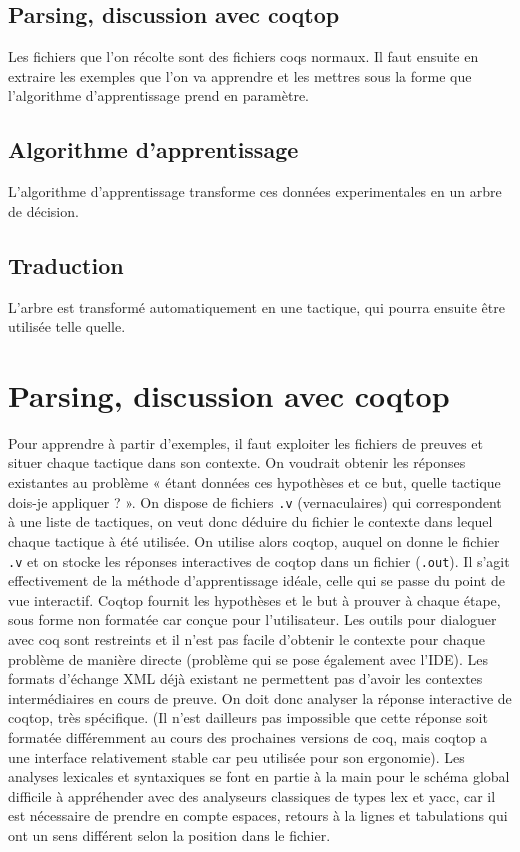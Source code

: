   \subsection{Parsing, discussion avec coqtop}
  Les fichiers que l'on récolte sont des fichiers coqs normaux. Il faut ensuite en extraire les exemples que l'on va apprendre et les mettres sous la forme que l'algorithme d'apprentissage prend en paramètre.

  \subsection{Algorithme d'apprentissage} 
  L'algorithme d'apprentissage transforme ces données experimentales en un arbre de décision.

  \subsection{Traduction}
  L'arbre est transformé automatiquement en une tactique, qui pourra ensuite être utilisée telle quelle.


  \section{Parsing, discussion avec coqtop}
  Pour apprendre à partir d'exemples, il faut exploiter les fichiers de preuves et situer chaque tactique dans son contexte. On voudrait obtenir les réponses existantes au problème « étant données ces hypothèses et ce but, quelle tactique dois-je appliquer ? ». On dispose de fichiers {\tt .v} (vernaculaires) qui correspondent à une liste de tactiques, on veut donc déduire du fichier le contexte dans lequel chaque tactique à été utilisée. On utilise alors coqtop, auquel on donne le fichier {\tt .v} et on stocke les réponses interactives de coqtop dans un fichier ({\tt .out}). Il s'agit effectivement de la méthode d'apprentissage idéale, celle qui se passe du point de vue interactif. Coqtop fournit les hypothèses et le but à prouver à chaque étape, sous forme non formatée car conçue pour l'utilisateur. Les outils pour dialoguer avec coq sont restreints et il n'est pas facile d'obtenir le contexte pour chaque problème de manière directe (problème qui se pose également avec l'IDE). Les formats d'échange XML déjà existant ne permettent pas d'avoir les contextes intermédiaires en cours de preuve. On doit donc analyser la réponse interactive de coqtop, très spécifique. (Il n'est dailleurs pas impossible que cette réponse soit formatée différemment au cours des prochaines versions de coq, mais coqtop a une interface relativement stable car peu utilisée pour son ergonomie). Les analyses lexicales et syntaxiques se font en partie à la main pour le schéma global difficile à appréhender avec des analyseurs classiques de types lex et yacc, car il est nécessaire de prendre en compte espaces, retours à la lignes et tabulations qui ont un sens différent selon la position dans le fichier.
  
